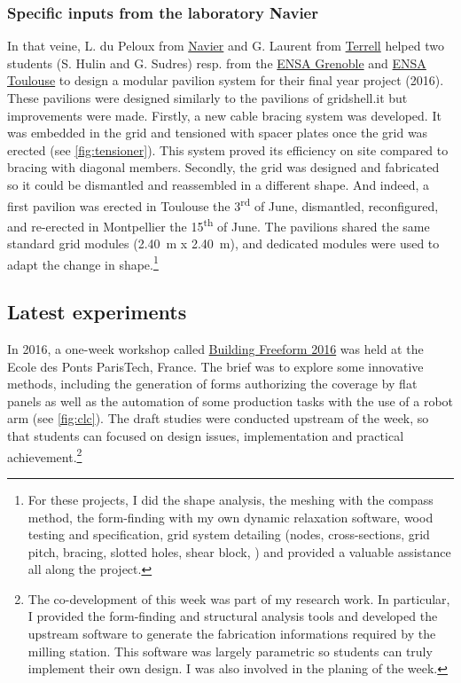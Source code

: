 \subsubsection{Specific inputs from the laboratory Navier}
In that veine, L. du Peloux from \href{http://navier.enpc.fr}{Navier} and G. Laurent from \href{http://terrellgroup.net/index.php}{Terrell} helped two students (S. Hulin and G. Sudres) resp. from the \href{http://www.grenoble.archi.fr/en/school/educational-innovation.php}{ENSA Grenoble} and \href{http://www.toulouse.archi.fr/fr/index.html}{ENSA Toulouse} to design a modular pavilion system for their final year project (2016). These pavilions were designed similarly to the pavilions of gridshell.it but improvements were made. Firstly, a new cable bracing system was developed. It was embedded in the grid and tensioned with spacer plates once the grid was erected (see \cref{fig:tensioner}). This system proved its efficiency on site compared to bracing with diagonal members. Secondly, the grid was designed and fabricated so it could be dismantled and reassembled in a different shape. And indeed, a first pavilion was erected in Toulouse the 3\textsuperscript{rd} of June, dismantled, reconfigured, and re-erected in Montpellier the 15\textsuperscript{th} of June. The pavilions shared the same standard grid modules (\SI{2.40}{m} x \SI{2.40}{m}), and dedicated modules were used to adapt the change in shape.\footnote{For these projects, I did the shape analysis, the meshing with the compass method, the form-finding with my own dynamic relaxation software, wood testing and specification, grid system detailing (nodes, cross-sections, grid pitch, bracing, slotted holes, shear block, \telp{}) and provided a valuable assistance all along the project.}

\subsection{Latest experiments}

In 2016, a one-week workshop called \href{http://thinkshell.fr/freeform-wooden-gridshell-2016/}{Building Freeform 2016} was held at the Ecole des Ponts ParisTech, France. The brief was to explore some innovative methods, including the generation of forms authorizing the coverage by flat panels as well as the automation of some production tasks with the use of a robot arm (see \cref{fig:clc}). The draft studies were conducted upstream of the week, so that students can focused on design issues, implementation and practical achievement.\footnote{The co-development of this week was part of my research work. In particular, I provided the form-finding and structural analysis tools and developed the upstream software to generate the fabrication informations required by the milling station. This software was largely parametric so students can truly implement their own design. I was also involved in the planing of the week.}

